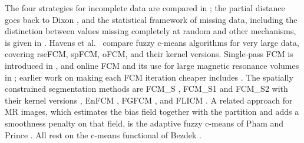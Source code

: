 The four strategies for incomplete data are compared in \cite{hathaway:2001:incomplete}; the partial distance goes back to Dixon \cite{dixon:1979:missing}, and the statistical framework of missing data, including the distinction between values missing completely at random and other mechanisms, is given in \cite{little:2002:missing}. Havens et al.\ \cite{havens:2012:large} compare fuzzy c-means algorithms for very large data, covering rseFCM, spFCM, oFCM, and their kernel versions. Single-pass FCM is introduced in \cite{hore:2007:spfcm}, and online FCM and its use for large magnetic resonance volumes in \cite{hore:2009:scalable}; earlier work on making each FCM iteration cheaper includes \cite{cannon:1986:efficient,kolen:2002:complexity}. The spatially constrained segmentation methods are FCM\_S \cite{ahmed:2002:fcms}, FCM\_S1 and FCM\_S2 with their kernel versions \cite{chen:2004:fcms12}, EnFCM \cite{szilagyi:2003:enfcm}, FGFCM \cite{cai:2007:fgfcm}, and FLICM \cite{krinidis:2010:flicm}. A related approach for MR images, which estimates the bias field together with the partition and adds a smoothness penalty on that field, is the adaptive fuzzy c-means of Pham and Prince \cite{pham:1999:afcm}. All rest on the c-means functional of Bezdek \cite{bezdek:1981}.
